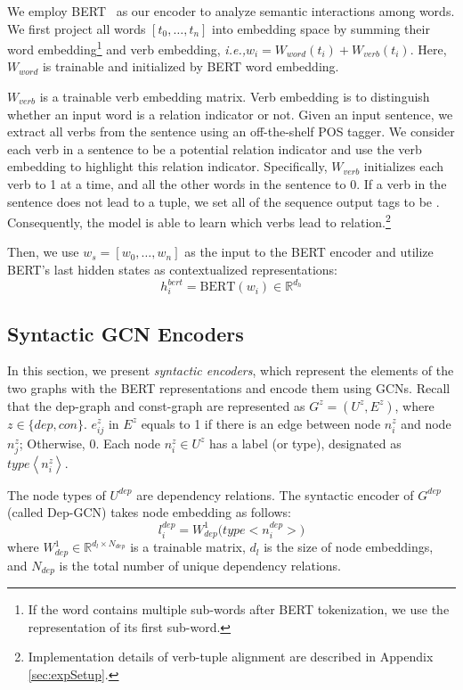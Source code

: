 \documentclass[11pt]{article}
\newcommand{\ie}{\emph{i.e.,}\xspace}
\begin{document}
We employ BERT~\cite{devlin2018bert} as our encoder to analyze semantic interactions among words.
We first project all words $[t_0, \dots, t_n]$ into embedding space by summing their word embedding\footnote{If the word contains multiple sub-words after BERT tokenization, we use the representation of its first sub-word.} and verb embedding, \ie $w_i=W_{word}(t_i)+W_{verb}(t_i)$.
Here, $W_{word}$ is trainable and initialized by BERT word embedding.

$W_{verb}$ is a trainable verb embedding matrix. 
Verb embedding is to distinguish whether an input word is a relation indicator or not.
Given an input sentence, we extract all verbs from the sentence using an off-the-shelf POS tagger.
We consider each verb in a sentence to be a potential relation indicator and use the verb embedding to highlight this relation indicator. 
Specifically, $W_{verb}$ initializes each verb to 1 at a time, and all the other words in the sentence to 0.
If a verb in the sentence does not lead to a tuple, we set all of the sequence output tags to be .
Consequently, the model is able to learn which verbs lead to relation.\footnote{Implementation details of verb-tuple alignment are described in Appendix \ref{sec:expSetup}.}

Then, we use $w_s=[w_0, \dots, w_n]$ as the input to the BERT encoder and utilize BERT's last hidden states as contextualized representations:
\begin{equation}\label{eq:h_i}
    h_i^{bert} = \mathrm{BERT}(w_i)  \in \mathbb{R} ^ {d_h}
\end{equation}




\subsection{Syntactic GCN Encoders}



In this section, we present \textit{syntactic encoders}, which represent the elements of the two graphs with the BERT representations and encode them using GCNs.
Recall that the dep-graph and const-graph are represented as $G^z=(U^z,E^z)$, where $z \in \{dep, con\}$. 
$e^z_{ij}$ in $E^z$ equals to 1 if there is an edge between node $n^z_i$ and node $n^z_j$;
Otherwise, 0. Each node $n^z_i \in U^z$ has a label (or type), designated as $type\left<n_i^z\right>$.

The node types of $U^{dep}$ are dependency relations. 
The  syntactic encoder of $G^{dep}$ (called Dep-GCN) takes node embedding as follows:
\begin{equation}
    l^{dep}_{i}=W_{dep}^1\big(type\big<n_i^{dep}\big>\big)
\end{equation}
where $W_{dep}^1 \in \mathbb{R} ^ {d_l \times N_{dep}}$ is a trainable matrix, $d_l$ is the size of node embeddings, and $N_{dep}$ is the total number of unique dependency relations. 
\end{document}

